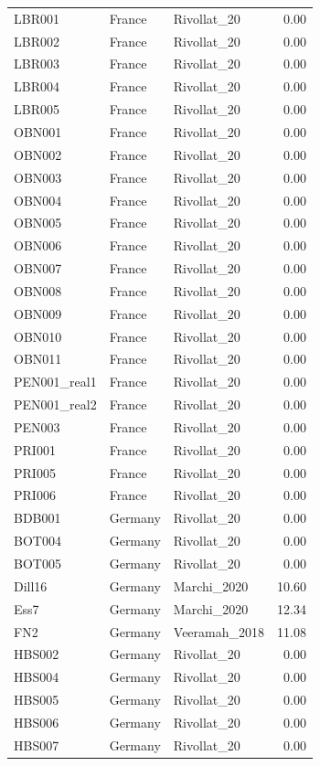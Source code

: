 \begin{longtable}[t]{lllr}
LBR001 & France & Rivollat\_20 & 0.00\\
LBR002 & France & Rivollat\_20 & 0.00\\
LBR003 & France & Rivollat\_20 & 0.00\\
LBR004 & France & Rivollat\_20 & 0.00\\
LBR005 & France & Rivollat\_20 & 0.00\\
OBN001 & France & Rivollat\_20 & 0.00\\
OBN002 & France & Rivollat\_20 & 0.00\\
OBN003 & France & Rivollat\_20 & 0.00\\
OBN004 & France & Rivollat\_20 & 0.00\\
OBN005 & France & Rivollat\_20 & 0.00\\
OBN006 & France & Rivollat\_20 & 0.00\\
OBN007 & France & Rivollat\_20 & 0.00\\
OBN008 & France & Rivollat\_20 & 0.00\\
OBN009 & France & Rivollat\_20 & 0.00\\
OBN010 & France & Rivollat\_20 & 0.00\\
OBN011 & France & Rivollat\_20 & 0.00\\
PEN001\_real1 & France & Rivollat\_20 & 0.00\\
PEN001\_real2 & France & Rivollat\_20 & 0.00\\
PEN003 & France & Rivollat\_20 & 0.00\\
PRI001 & France & Rivollat\_20 & 0.00\\
PRI005 & France & Rivollat\_20 & 0.00\\
PRI006 & France & Rivollat\_20 & 0.00\\
BDB001 & Germany & Rivollat\_20 & 0.00\\
BOT004 & Germany & Rivollat\_20 & 0.00\\
BOT005 & Germany & Rivollat\_20 & 0.00\\
Dill16 & Germany & Marchi\_2020 & 10.60\\
Ess7 & Germany & Marchi\_2020 & 12.34\\
FN2 & Germany & Veeramah\_2018 & 11.08\\
HBS002 & Germany & Rivollat\_20 & 0.00\\
HBS004 & Germany & Rivollat\_20 & 0.00\\
HBS005 & Germany & Rivollat\_20 & 0.00\\
HBS006 & Germany & Rivollat\_20 & 0.00\\
HBS007 & Germany & Rivollat\_20 & 0.00\\

\end{longtable}
